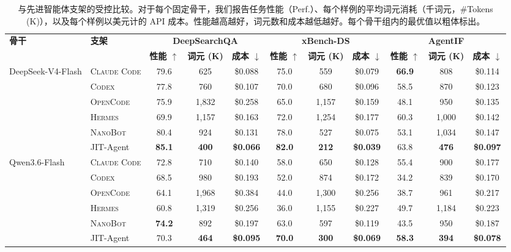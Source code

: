 \documentclass{article}
\newcommand{\ourmethod}{JIT-Agent\xspace}
\begin{document}
\begin{table}[!t]
\centering
\small
\setlength{\tabcolsep}{2.2pt}
\renewcommand{\arraystretch}{1.08}
\caption{与先进智能体支架的受控比较。对于每个固定骨干，我们报告任务性能（Perf.）、每个样例的平均词元消耗（千词元，\#Tokens (K)），以及每个样例以美元计的 API 成本。性能越高越好，词元数和成本越低越好。每个骨干组内的最优值以粗体标出。}
\label{tab:advanced_harness_comparison}
\begin{adjustbox}{max width=\textwidth}
\begin{tabular}{llccccccccc}
\toprule
\textbf{骨干} & \textbf{支架} & \multicolumn{3}{c}{\textbf{DeepSearchQA}} & \multicolumn{3}{c}{\textbf{xBench-DS}} & \multicolumn{3}{c}{\textbf{AgentIF}} \\
\cmidrule(lr){3-5}\cmidrule(lr){6-8}\cmidrule(lr){9-11}
 & & \textbf{性能 $\uparrow$} & \textbf{词元 (K)} & \textbf{成本 $\downarrow$} & \textbf{性能 $\uparrow$} & \textbf{词元 (K)} & \textbf{成本 $\downarrow$} & \textbf{性能 $\uparrow$} & \textbf{词元 (K)} & \textbf{成本 $\downarrow$} \\
\midrule
\multirow{6}{*}{DeepSeek-V4-Flash} & \textsc{Claude Code} & 79.6 & 625 & \$0.088 & 75.0 & 559 & \$0.079 & \textbf{66.9} & 808 & \$0.114 \\
 & \textsc{Codex} & 77.8 & 760 & \$0.107 & 70.0 & 680 & \$0.096 & 58.5 & 870 & \$0.123 \\
 & \textsc{OpenCode} & 75.9 & 1,832 & \$0.258 & 65.0 & 1,157 & \$0.159 & 48.1 & 950 & \$0.135 \\
 & \textsc{Hermes} & 69.9 & 1,157 & \$0.163 & 72.0 & 1,254 & \$0.177 & 60.3 & 1,000 & \$0.142 \\
 & \textsc{NanoBot} & 80.4 & 924 & \$0.131 & 78.0 & 527 & \$0.075 & 53.1 & 1,034 & \$0.147 \\
 & \ourmethod & \textbf{85.1} & \textbf{400} & \textbf{\$0.066} & \textbf{82.0} & \textbf{212} & \textbf{\$0.039} & 63.8 & \textbf{476} & \textbf{\$0.097} \\
\midrule
\multirow{6}{*}{Qwen3.6-Flash} & \textsc{Claude Code} & 72.8 & 710 & \$0.140 & 58.0 & 650 & \$0.128 & 55.4 & 900 & \$0.177 \\
 & \textsc{Codex} & 68.5 & 980 & \$0.193 & 52.0 & 874 & \$0.172 & 34.2 & 839 & \$0.170 \\
 & \textsc{OpenCode} & 64.1 & 1,968 & \$0.384 & 44.0 & 1,300 & \$0.256 & 38.7 & 961 & \$0.217 \\
 & \textsc{Hermes} & 60.8 & 1,319 & \$0.256 & 36.0 & 1,155 & \$0.227 & 49.7 & 1,184 & \$0.223 \\
 & \textsc{NanoBot} & \textbf{74.2} & 892 & \$0.197 & 63.0 & 597 & \$0.119 & 43.5 & 950 & \$0.187 \\
 & \ourmethod & 70.3 & \textbf{464} & \textbf{\$0.095} & \textbf{70.0} & \textbf{300} & \textbf{\$0.069} & \textbf{58.3} & \textbf{394} & \textbf{\$0.078} \\
\bottomrule
\end{tabular}
\end{adjustbox}
\end{table}
\end{document}
